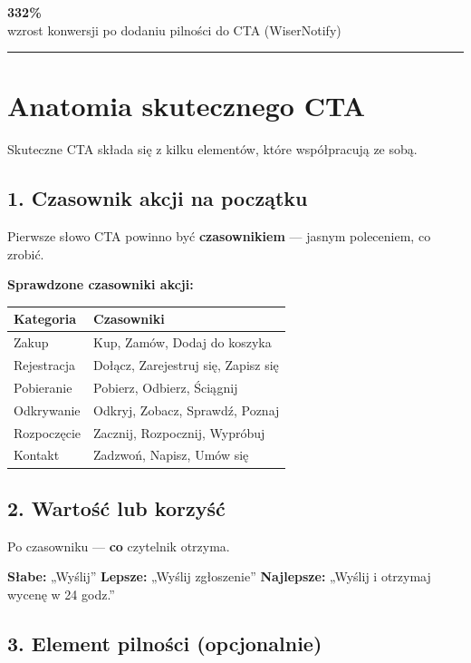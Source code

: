 \documentclass[
  12pt,
  a4paper,
  twoside,
  openright,
  12pt,
  DIV=12,
  BCOR=12mm]{scrbook}
\newcommand{\decoline}{%
  \begin{center}
    \textcolor{bordergray}{\rule{0.3\textwidth}{0.5pt}}
  \end{center}
}
\newcommand{\stathighlight}[2]{%
  \begin{center}
    \begin{tcolorbox}[
      enhanced,
      colback=primarylight,
      colframe=primaryblue,
      boxrule=1pt,
      arc=5pt,
      width=0.6\textwidth,
      halign=center
    ]
      {\fontsize{36}{40}\selectfont\bfseries\color{primarydark}#1}\\[5pt]
      {\color{textmuted}#2}
    \end{tcolorbox}
  \end{center}
}
\begin{document}
\stathighlight{332\%}{wzrost konwersji po dodaniu pilności do CTA (WiserNotify)}

\decoline

\section{Anatomia skutecznego CTA}\label{anatomia-skutecznego-cta}

Skuteczne CTA składa się z kilku elementów, które współpracują ze sobą.

\subsection{1. Czasownik akcji na
początku}\label{czasownik-akcji-na-poczux105tku}

Pierwsze słowo CTA powinno być \textbf{czasownikiem} --- jasnym
poleceniem, co zrobić.

\textbf{Sprawdzone czasowniki akcji:}

\begin{longtable}[]{@{}ll@{}}
\toprule\noalign{}
Kategoria & Czasowniki \\
\midrule\noalign{}
\endhead
\bottomrule\noalign{}
\endlastfoot
Zakup & Kup, Zamów, Dodaj do koszyka \\
Rejestracja & Dołącz, Zarejestruj się, Zapisz się \\
Pobieranie & Pobierz, Odbierz, Ściągnij \\
Odkrywanie & Odkryj, Zobacz, Sprawdź, Poznaj \\
Rozpoczęcie & Zacznij, Rozpocznij, Wypróbuj \\
Kontakt & Zadzwoń, Napisz, Umów się \\
\end{longtable}

\subsection{2. Wartość lub
korzyść}\label{wartoux15bux107-lub-korzyux15bux107}

Po czasowniku --- \textbf{co} czytelnik otrzyma.

\textbf{Słabe:} „Wyślij'' \textbf{Lepsze:} „Wyślij zgłoszenie''
\textbf{Najlepsze:} „Wyślij i otrzymaj wycenę w 24 godz.''

\subsection{3. Element pilności
(opcjonalnie)}\label{element-pilnoux15bci-opcjonalnie}
\end{document}
